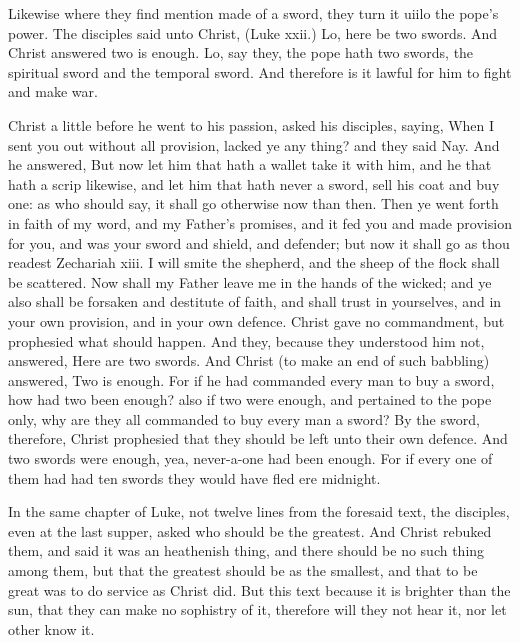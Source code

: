 Likewise where they find mention made of a sword, they 
turn it uiilo the pope's power. The disciples said unto 
Christ, (Luke xxii.) Lo, here be two swords. And Christ 
answered two is enough. Lo, say they, the pope 
hath two swords, the spiritual sword and the temporal 
sword. And therefore is it lawful for him to fight and 
make war. 

Christ a little before he went to his passion, asked his 
disciples, saying, When I sent you out without all provision,
lacked ye any thing? and they said Nay. And he 
answered, But now let him that hath a wallet take it with 
him, and he that hath a scrip likewise, and let him that 
hath never a sword, sell his coat and buy one: as who 
should say, it shall go otherwise now than then. Then ye 
went forth in faith of my word, and my Father's promises, 
and it fed you and made provision for you, and was your 
sword and shield, and defender; but now it shall go as 
thou readest Zechariah xiii. I will smite the shepherd, and 
the sheep of the flock shall be scattered. Now shall my 
Father leave me in the hands of the wicked; and ye also 
shall be forsaken and destitute of faith, and shall trust in 
yourselves, and in your own provision, and in your own 
defence. Christ gave no commandment, but prophesied 
what should happen. And they, because they understood 
him not, answered, Here are two swords. And Christ (to 
make an end of such babbling) answered, Two is enough. 
For if he had commanded every man to buy a sword, how 
had two been enough? also if two were enough, and pertained
to the pope only, why are they all commanded to 
buy every man a sword? By the sword, therefore, Christ 
prophesied that they should be left unto their own defence. 
And two swords were enough, yea, never-a-one had been 
enough. For if every one of them had had ten swords they 
would have fled ere midnight. 

In the same chapter of Luke, not twelve lines from the 
foresaid text, the disciples, even at the last supper, 
asked who should be the greatest. And Christ rebuked 
them, and said it was an heathenish thing, and there 
should be no such thing among them, but that the 
greatest should be as the smallest, and that to be great 
was to do service as Christ did. But this text because 
it is brighter than the sun, that they can make no sophistry
of it, therefore will they not hear it, nor let other 
know it. 

